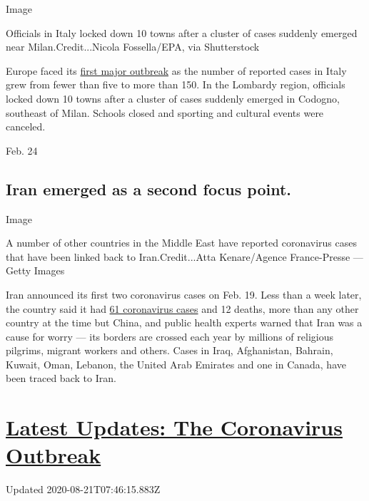 Image

Officials in Italy locked down 10 towns after a cluster of cases
suddenly emerged near Milan.Credit...Nicola Fossella/EPA, via
Shutterstock

Europe faced its
\href{https://www.nytimes3xbfgragh.onion/2020/02/23/world/europe/italy-coronavirus.html}{first
major outbreak} as the number of reported cases in Italy grew from fewer
than five to more than 150. In the Lombardy region, officials locked
down 10 towns after a cluster of cases suddenly emerged in Codogno,
southeast of Milan. Schools closed and sporting and cultural events were
canceled.

Feb. 24

\hypertarget{iran-emerged-as-a-second-focus-point}{%
\subsection{Iran emerged as a second focus
point.}\label{iran-emerged-as-a-second-focus-point}}

Image

A number of other countries in the Middle East have reported coronavirus
cases that have been linked back to Iran.Credit...Atta Kenare/Agence
France-Presse --- Getty Images

Iran announced its first two coronavirus cases on Feb. 19. Less than a
week later, the country said it had
\href{https://www.nytimes3xbfgragh.onion/2020/02/24/world/asia/china-coronavirus.html\#link-755cef26}{61
coronavirus cases} and 12 deaths, more than any other country at the
time but China, and public health experts warned that Iran was a cause
for worry --- its borders are crossed each year by millions of religious
pilgrims, migrant workers and others. Cases in Iraq, Afghanistan,
Bahrain, Kuwait, Oman, Lebanon, the United Arab Emirates and one in
Canada, have been traced back to Iran.

\hypertarget{latest-updates-the-coronavirus-outbreak}{%
\section{\texorpdfstring{\href{https://www.nytimes3xbfgragh.onion/2020/08/20/world/coronavirus-covid.html?action=click\&pgtype=Article\&state=default\&region=MAIN_CONTENT_1\&context=storylines_live_updates}{Latest
Updates: The Coronavirus
Outbreak}}{Latest Updates: The Coronavirus Outbreak}}\label{latest-updates-the-coronavirus-outbreak}}

Updated 2020-08-21T07:46:15.883Z

